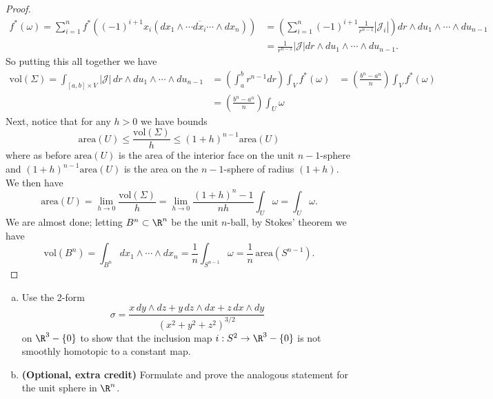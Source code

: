 \documentclass[11pt,letterpaper]{article}
\begin{document}
\begin{solution}
\begin{proof}
    \[
        \begin{aligned}
        f^*(\omega)=\sum^{n}_{i=1}f^*((-1)^{i+1}x_i(dx_1\wedge\cdots\overline{dx_i}\cdots\wedge dx_n))&=\left(\sum^n_{i=1}(-1)^{i+1}\frac{1}{r^{n-1}}|\mathcal{J}_i|\right)dr\wedge du_1\wedge\cdots\wedge du_{n-1}\\
        &=\frac{1}{r^{n-1}}|\mathcal{J}|dr\wedge du_1\wedge\cdots\wedge du_{n-1}.
        \end{aligned}
    \] 
    So putting this all together we have
    \[
        \begin{aligned}
            \textrm{vol}(\Sigma)=\int_{[a,b]\times V} |\mathcal{J}|\,dr\wedge du_1\wedge\cdots\wedge du_{n-1}&=\left(\int_a^b r^{n-1}dr\right)\int_Vf^*(\omega)&=\left(\frac{b^n-a^n}{n}\right)\int_V f^*(\omega)\\
            &=\left(\frac{b^n-a^n}{n}\right)\int_U \omega
        \end{aligned}
    \]             
    Next, notice that for any $h>0$ we have bounds
    \[
        \textrm{area}(U)\leq \frac{\textrm{vol}(\Sigma)}{h}\leq (1+h)^{n-1}\textrm{area}(U)
    \]
    where as before $\textrm{area}(U)$ is the area of the interior face on the unit $n-1$-sphere and $(1+h)^{n-1}\textrm{area}(U)$ is the area on the $n-1$-sphere of radius $(1+h)$. We then have
    \[
        \textrm{area}(U)=\lim_{h\to 0}\frac{\textrm{vol}(\Sigma)}{h}=\lim_{h\to 0}\frac{(1+h)^n-1}{nh}\int_U \omega = \int_U \omega
    .\]
    We are almost done; letting $B^n\subset \R^n$ be the unit $n$-ball, by Stokes' theorem we have
    \[
        \textrm{vol}(B^n)=\int_{B^n} dx_1\wedge\cdots\wedge dx_n = \frac{1}{n}\int_{S^{n-1}}\omega=\frac{1}{n}\,\textrm{area}(S^{n-1})
    .\]  
    \end{proof}
\end{solution}

\begin{problem}\noindent
    \begin{enumerate}[(a)]
        \item Use the 2-form \[\sigma=\dfrac{x\,dy\wedge dz+y\,dz\wedge dx+z\,dx\wedge dy}{ (x^2+y^2+z^2)^{3/2}}\] on $\R^3-\{0\}$ to show that the inclusion map $i:S^2\to \R^3-\{0\}$ is not smoothly homotopic to a constant map.
        \item \textbf{(Optional, extra credit)} Formulate and prove the analogous statement for the unit sphere in $\R^n$.
    \end{enumerate}


\end{problem}
\end{document}
